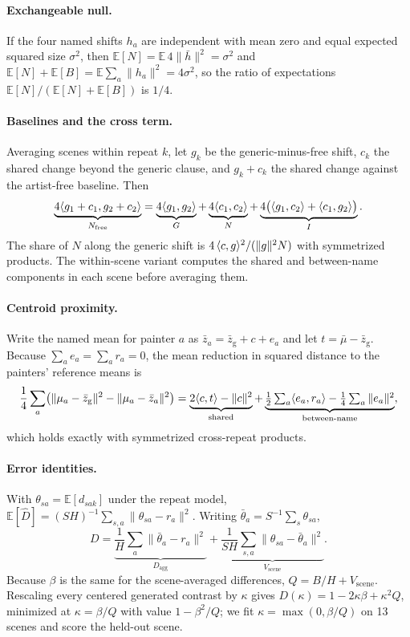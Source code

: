 \paragraph{Exchangeable null.} If the four named shifts $h_a$ are independent with mean zero and
equal expected squared size $\sigma^2$, then $\mathbb E[N]=\mathbb E\,4\|\bar h\|^2=\sigma^2$ and
$\mathbb E[N]+\mathbb E[B]=\mathbb E\sum_a\|h_a\|^2=4\sigma^2$, so the ratio of expectations
$\mathbb E[N]/(\mathbb E[N]+\mathbb E[B])$ is $1/4$.

\paragraph{Baselines and the cross term.} Averaging scenes within repeat $k$, let $g_k$ be the
generic-minus-free shift, $c_k$ the shared change beyond the generic clause, and $g_k+c_k$ the
shared change against the artist-free baseline. Then
\begin{equation}
\underbrace{4\langle g_1+c_1,g_2+c_2\rangle}_{N_{\mathrm{free}}}=\underbrace{4\langle g_1,g_2\rangle}_{G}
+\underbrace{4\langle c_1,c_2\rangle}_{N}
+\underbrace{4\bigl(\langle g_1,c_2\rangle+\langle c_1,g_2\rangle\bigr)}_{I}.
\end{equation}
The share of $N$ along the generic shift is $4\,\langle c,g\rangle^2/(\|g\|^2N)$ with symmetrized
products. The within-scene variant computes the shared and between-name components in each
scene before averaging them.

\paragraph{Centroid proximity.} Write the named mean for painter $a$ as $\bar z_a=\bar
z_{\mathrm{g}}+c+e_a$ and let $t=\bar\mu-\bar z_{\mathrm{g}}$. Because $\sum_ae_a=\sum_ar_a=0$,
the mean reduction in squared distance to the painters' reference means is
\begin{equation}
\frac14\sum_a\bigl(\|\mu_a-\bar z_{\mathrm{g}}\|^2-\|\mu_a-\bar z_a\|^2\bigr)
=\underbrace{2\langle c,t\rangle-\|c\|^2}_{\text{shared}}
+\underbrace{\tfrac12\textstyle\sum_a\langle e_a,r_a\rangle-\tfrac14\sum_a\|e_a\|^2}_{\text{between-name}},
\end{equation}
which holds exactly with symmetrized cross-repeat products.

\paragraph{Error identities.} With $\theta_{sa}=\mathbb E[d_{sak}]$ under the repeat model,
$\mathbb E[\widehat D]=(SH)^{-1}\sum_{s,a}\|\theta_{sa}-r_a\|^2$. Writing
$\bar\theta_a=S^{-1}\sum_s\theta_{sa}$,
\begin{equation}
D=\underbrace{\frac1H\sum_a\|\bar\theta_a-r_a\|^2}_{D_{\mathrm{agg}}}
+\underbrace{\frac{1}{SH}\sum_{s,a}\|\theta_{sa}-\bar\theta_a\|^2}_{V_{\mathrm{scene}}}.
\end{equation}
Because $\beta$ is the same for the scene-averaged differences, $Q=B/H+V_{\mathrm{scene}}$.
Rescaling every centered generated contrast by $\kappa$ gives $D(\kappa)=1-2\kappa\beta+\kappa^2Q$,
minimized at $\kappa=\beta/Q$ with value $1-\beta^2/Q$; we fit $\kappa=\max(0,\beta/Q)$ on 13
scenes and score the held-out scene.

